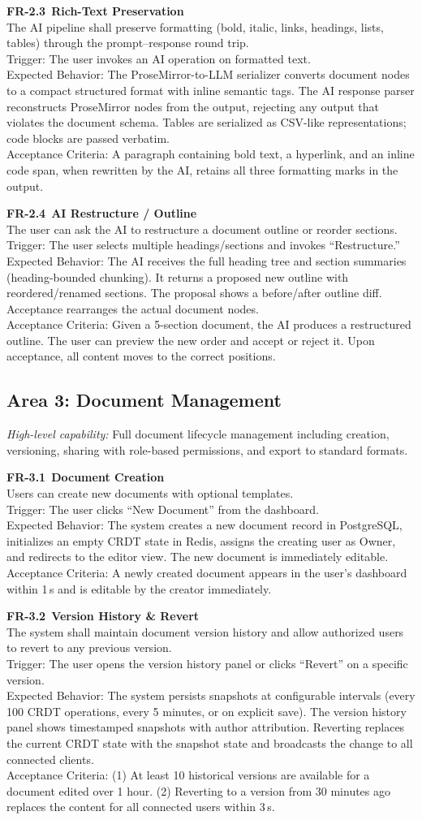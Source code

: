 \documentclass[10pt, a4paper]{article}
\newcommand{\requirement}[1]{\textcolor{accent}{\textsf{\textbf{#1}}}}
\newcommand{\lightrule}{{\color{border}\rule{\textwidth}{0.4pt}}}
\newcommand{\frcard}[6]{%
\vspace{4pt}
\noindent\begin{minipage}{\textwidth}
\noindent\requirement{#1}~\textbf{#2}\\[2pt]
{\small\color{inkSoft}#3}\\[3pt]
{\small\color{inkMuted}\textsf{Trigger:}} {\small #4}\\[1pt]
{\small\color{inkMuted}\textsf{Expected Behavior:}} {\small #5}\\[1pt]
{\small\color{inkMuted}\textsf{Acceptance Criteria:}} {\small #6}
\end{minipage}
\vspace{4pt}\lightrule\vspace{2pt}
}
\begin{document}
\frcard{FR-2.3}{Rich-Text Preservation}{The AI pipeline shall preserve formatting (bold, italic, links, headings, lists, tables) through the prompt--response round trip.}{The user invokes an AI operation on formatted text.}{The ProseMirror-to-LLM serializer converts document nodes to a compact structured format with inline semantic tags. The AI response parser reconstructs ProseMirror nodes from the output, rejecting any output that violates the document schema. Tables are serialized as CSV-like representations; code blocks are passed verbatim.}{A paragraph containing bold text, a hyperlink, and an inline code span, when rewritten by the AI, retains all three formatting marks in the output.}

\frcard{FR-2.4}{AI Restructure / Outline}{The user can ask the AI to restructure a document outline or reorder sections.}{The user selects multiple headings/sections and invokes ``Restructure.''}{The AI receives the full heading tree and section summaries (heading-bounded chunking). It returns a proposed new outline with reordered/renamed sections. The proposal shows a before/after outline diff. Acceptance rearranges the actual document nodes.}{Given a 5-section document, the AI produces a restructured outline. The user can preview the new order and accept or reject it. Upon acceptance, all content moves to the correct positions.}

\subsection{Area 3: Document Management}

{\small\textit{High-level capability:} Full document lifecycle management including creation, versioning, sharing with role-based permissions, and export to standard formats.}

\frcard{FR-3.1}{Document Creation}{Users can create new documents with optional templates.}{The user clicks ``New Document'' from the dashboard.}{The system creates a new document record in PostgreSQL, initializes an empty CRDT state in Redis, assigns the creating user as Owner, and redirects to the editor view. The new document is immediately editable.}{A newly created document appears in the user's dashboard within 1\,s and is editable by the creator immediately.}

\frcard{FR-3.2}{Version History \& Revert}{The system shall maintain document version history and allow authorized users to revert to any previous version.}{The user opens the version history panel or clicks ``Revert'' on a specific version.}{The system persists snapshots at configurable intervals (every 100 CRDT operations, every 5 minutes, or on explicit save). The version history panel shows timestamped snapshots with author attribution. Reverting replaces the current CRDT state with the snapshot state and broadcasts the change to all connected clients.}{(1) At least 10 historical versions are available for a document edited over 1 hour. (2) Reverting to a version from 30 minutes ago replaces the content for all connected users within 3\,s.}
\end{document}
